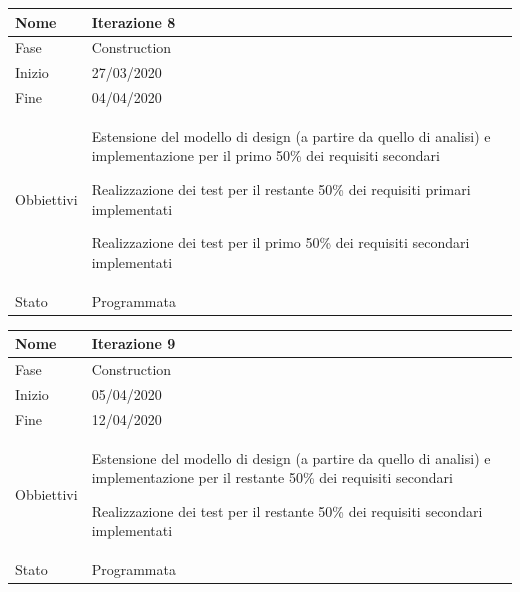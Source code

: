 \begin{center}
\begin{tabular}{ |p{2cm}|p{10cm}|  }
\hline
Nome & Iterazione 8 \\\hline
Fase & Construction \\\hline
Inizio & 27/03/2020 \\\hline
Fine &  04/04/2020  \\\hline
Obbiettivi & 
	\begin{compactitem}
		\item Estensione del modello di design (a partire da quello di analisi) e implementazione per il primo 50\% dei requisiti secondari
		\item Realizzazione dei test per il restante 50\% dei requisiti primari implementati
		\item Realizzazione dei test per il primo 50\% dei requisiti secondari implementati
		
	\end{compactitem}\\\hline
Stato &  Programmata \\\hline
\end{tabular}
\label{table:8}\newline

\begin{tabular}{ |p{2cm}|p{10cm}|  }
\hline
Nome & Iterazione 9 \\\hline
Fase & Construction \\\hline
Inizio & 05/04/2020 \\\hline
Fine &  12/04/2020  \\\hline
Obbiettivi & 
	\begin{compactitem}
		\item Estensione del modello di design (a partire da quello di analisi) e implementazione per il restante 50\% dei requisiti secondari
		\item Realizzazione dei test per il restante 50\% dei requisiti secondari implementati
		
	\end{compactitem}\\\hline
Stato &  Programmata \\\hline
\end{tabular}
\label{table:9}\newline


\end{center}
